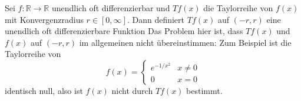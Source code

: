\documentclass[../main.tex]{subfiles}
\begin{document}
\begin{example}
  Sei $f \colon \mathbb{R} \to \mathbb{R}$ unendlich oft differenzierbar und
  $Tf(x)$ die Taylorreihe von $f(x)$ mit Konvergenzradius $r \in [0, \infty]$.
  Dann definiert $Tf(x)$ auf $(-r, r)$ eine unendlich oft differenzierbare Funktion
  Das Problem hier ist, dass $Tf(x) $ und $f(x)$ auf $(-r, r)$ im allgemeinen
  nicht übereinstimmen:
  Zum Beispiel ist die Taylorreihe von
  \[
    f(x) =
    \begin{cases}
      e^{-1/x^2} & x \neq 0\\
      0 & x = 0
    \end{cases}
  \]
  identisch null, also ist $f(x)$ nicht durch $Tf(x)$ bestimmt.
\end{example}
\end{document}

